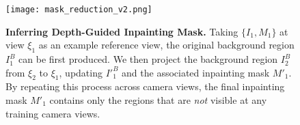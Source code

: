 \begin{figure}[t]
	\centering
	\texttt{[image: mask\_reduction\_v2.png]}
    \caption{\textbf{Inferring Depth-Guided Inpainting Mask.}  
    Taking $\{I_1, M_1\}$ at view $\xi_1$ as an example reference view, the original background region $I^B_1$ can be first produced. We then project the background region $I^B_2$ from $\xi_2$ to $\xi_1$, updating ${I'}^B_1$ and the associated inpainting mask $M'_1$. By repeating this process across camera views, the final inpainting mask $M'_1$ contains only the regions that are \textit{not} visible at any training camera views.}
    \vspace{-1mm}
	\label{fig:mask_reduct}
\end{figure}


